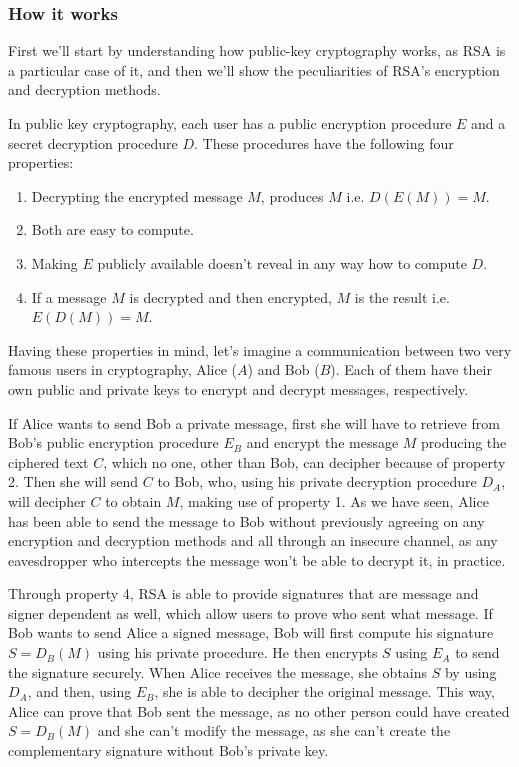\subsubsection{How it works}

First we’ll start by understanding how public-key cryptography works, as RSA is
a particular case of it, and then we’ll show the peculiarities of RSA's
encryption and decryption methods.

In public key cryptography, each user has a public encryption procedure $E$ and a
secret decryption procedure $D$. These procedures have the following four
properties:

\begin{enumerate}
    \item Decrypting the encrypted message $M$, produces $M$ i.e. $D(E(M)) = M$.
    \item Both are easy to compute.
    \item Making $E$ publicly available doesn't reveal in any way how to compute $D$.
    \item If a message $M$ is decrypted and then encrypted, $M$ is the result i.e. $E(D(M)) = M$.
\end{enumerate}

Having these properties in mind, let's imagine a communication between two very
famous users in cryptography, Alice ($A$) and Bob ($B$). Each of them have their own
public and private keys to encrypt and decrypt messages, respectively.

If Alice wants to send Bob a private message, first she will have to retrieve
from Bob's public encryption procedure $E_B$ and encrypt the message $M$ producing
the ciphered text $C$, which no one, other than Bob, can decipher because of
property 2. Then she will send $C$ to Bob, who, using his private decryption
procedure $D_A$, will decipher $C$ to obtain $M$, making use of property 1. As we have
seen, Alice has been able to send the message to Bob without previously agreeing
on any encryption and decryption methods and all through an insecure channel, as
any eavesdropper who intercepts the message won't be able to decrypt it, in
practice.

Through property 4, RSA is able to provide signatures that are message and
signer dependent as well, which allow users to prove who sent what message. If
Bob wants to send Alice a signed message, Bob will first compute his signature
$S=D_B(M)$ using his private procedure. He then encrypts $S$ using $E_A$ to send the
signature securely. When Alice receives the message, she obtains $S$ by using
$D_A$,
and then, using $E_B$, she is able to decipher the original message. This way,
Alice can prove that Bob sent the message, as no other person could have created
$S=D_B(M)$ and she can't modify the message, as she can't create the complementary
signature without Bob's private key.

